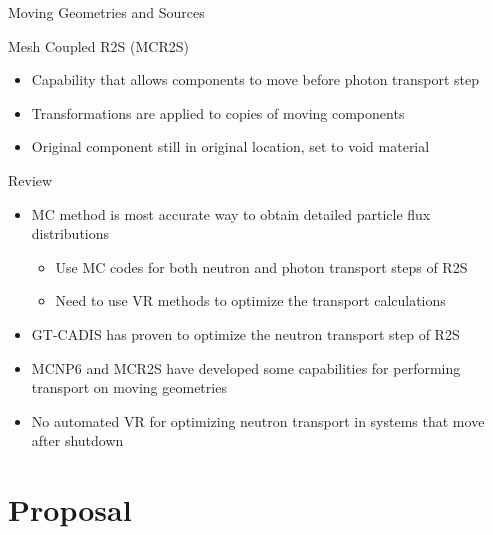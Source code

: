 \documentclass{beamer}
\begin{document}
\begin{frame}{Moving Geometries and Sources}
	\begin{block}{Mesh Coupled R2S (MCR2S)\cite{mcr2s}}
	\begin{itemize}
		\item{Capability that allows components to move before photon
			transport step}
		\item{Transformations are applied to copies of moving
			components}
		\item{Original component still in original location, set to void material}
	\end{itemize}
		\end{block}
\end{frame}

\begin{frame}{Review}
	\begin{itemize}
		\item{MC method is most accurate way to obtain detailed
			particle flux distributions}
			\begin{itemize}
          	  	  \item{Use MC codes for both neutron and photon transport steps
          	  	  	of R2S}
          	  	  \item{Need to use VR methods to optimize the transport
          	  	  	calculations}
          		\end{itemize}
		\item{GT-CADIS has proven to optimize the neutron transport
			step of R2S}
		\item{MCNP6 and MCR2S have developed some capabilities for
			performing transport on moving geometries}
		\item{No automated VR for optimizing neutron transport
			in systems that move after shutdown}
	\end{itemize}

\end{frame}



\section{Proposal}
\end{document}
